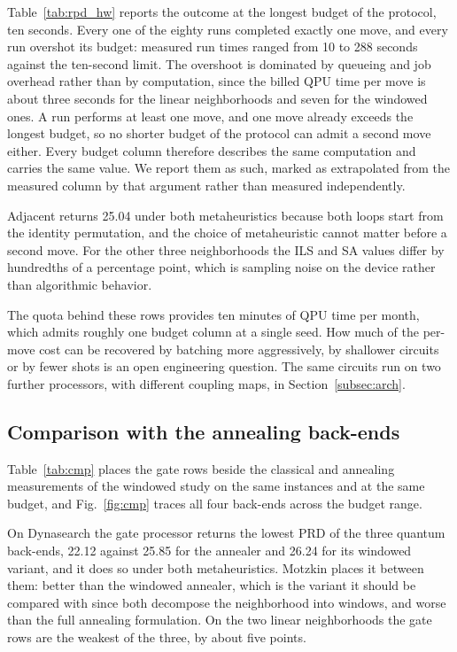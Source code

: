 \documentclass{svproc}
\begin{document}
Table~\ref{tab:rpd_hw} reports the outcome at the longest budget of the
protocol, ten seconds. Every one of the eighty runs completed exactly one move,
and every run overshot its budget: measured run times ranged from 10 to 288
seconds against the ten-second limit. The overshoot is dominated by queueing and
job overhead rather than by computation, since the billed QPU time per move is
about three seconds for the linear neighborhoods and seven for the windowed
ones. A run performs at least one move, and one move already exceeds the longest
budget, so no shorter budget of the protocol can admit a second move either.
Every budget column therefore describes the same computation and carries the
same value. We report them as such, marked as extrapolated from the measured
column by that argument rather than measured independently.

Adjacent returns 25.04 under both metaheuristics because both loops start from
the identity permutation, and the choice of metaheuristic cannot matter before a
second move. For the other three neighborhoods the ILS and SA values differ by
hundredths of a percentage point, which is sampling noise on the device rather
than algorithmic behavior.

The quota behind these rows provides ten minutes of QPU time per month, which
admits roughly one budget column at a single seed. How much of the per-move
cost can be recovered by batching more aggressively, by shallower circuits or
by fewer shots is an open engineering question. The same circuits run on two
further processors, with different coupling maps, in
Section~\ref{subsec:arch}.

\subsection{Comparison with the annealing back-ends}
\label{subsec:cmp}
Table~\ref{tab:cmp} places the gate rows beside the classical and annealing
measurements of the windowed study on the same instances and at the same budget,
and Fig.~\ref{fig:cmp} traces all four back-ends across the budget range.

On Dynasearch the gate processor returns the lowest PRD of the three quantum
back-ends, 22.12 against 25.85 for the annealer and 26.24 for its windowed
variant, and it does so under both metaheuristics. Motzkin places it between
them: better than the windowed annealer, which is the variant it should be
compared with since both decompose the neighborhood into windows, and worse than
the full annealing formulation. On the two linear neighborhoods the gate rows
are the weakest of the three, by about five points.
\end{document}
